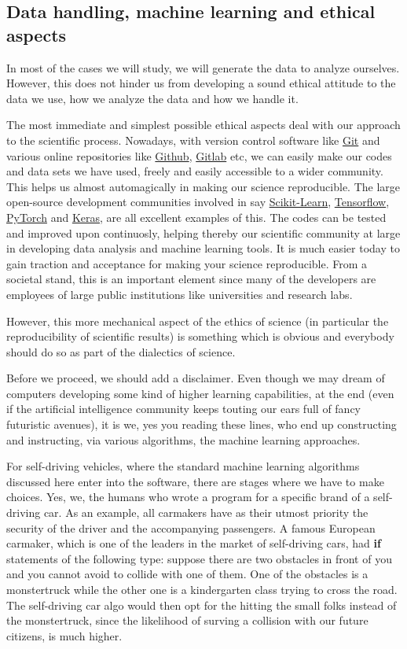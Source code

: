 \documentclass[%
oneside,                 %
final,                   %
10pt]{article}
\begin{document}
\subsection{Data handling, machine learning  and ethical aspects}

In most of the cases we will study, we will generate the data
to analyze ourselves. However, this does not hinder us from developing a sound
ethical attitude to the data we use, how we analyze the data and how
we handle it.

The most immediate and simplest possible ethical aspects deal with our
approach to the scientific process. Nowadays, with version control
software like \href{{https://git-scm.com/}}{Git} and various online
repositories like \href{{https://github.com/}}{Github},
\href{{https://about.gitlab.com/}}{Gitlab} etc, we can easily make our codes
and data sets we have used, freely and easily accessible to a wider
community. This helps us almost automagically in making our science
reproducible. The large open-source development communities involved
in say \href{{http://scikit-learn.org/stable/}}{Scikit-Learn},
\href{{https://www.tensorflow.org/}}{Tensorflow},
\href{{http://pytorch.org/}}{PyTorch} and \href{{https://keras.io/}}{Keras}, are
all excellent examples of this. The codes can be tested and improved
upon continuosly, helping thereby our scientific community at large in
developing data analysis and machine learning tools.  It is much
easier today to gain traction and acceptance for making your science
reproducible. From a societal stand, this is an important element
since many of the developers are employees of large public institutions like
universities and research labs.

However, this more mechanical aspect of the ethics of science (in
particular the reproducibility of scientific results) is something
which is obvious and everybody should do so as part of the dialectics of
science. 

Before we proceed, we should add a disclaimer. Even though
we may dream of computers developing some kind of higher learning
capabilities, at the end (even if the artificial intelligence
community keeps touting our ears full of fancy futuristic avenues), it is we, yes you reading these lines,
who end up constructing and instructing, via various algorithms, the
machine learning approaches. 

For self-driving vehicles, where the standard machine
learning algorithms discussed here enter into the software, there are
stages where we have to make choices. Yes, we, the humans who wrote
a program for a specific brand of a self-driving car.  As an example,
all carmakers have as their utmost priority the security of the
driver and the accompanying passengers. A famous European carmaker, which is
one of the leaders in the market of self-driving cars, had \textbf{if}
statements of the following type: suppose there are two obstacles in
front of you and you cannot avoid to collide with one of them. One of
the obstacles is a monstertruck while the other one is a kindergarten
class trying to cross the road. The self-driving car algo would then
opt for the hitting the small folks instead of the monstertruck, since
the likelihood of surving a collision with our future citizens, is
much higher.
\end{document}
